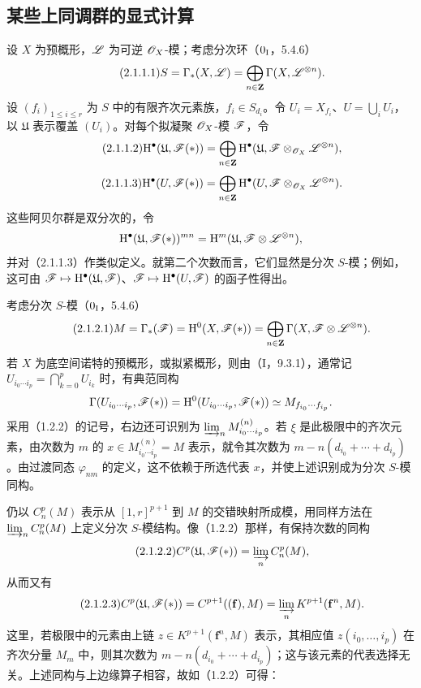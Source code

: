 \subsection{某些上同调群的显式计算}
设 $X$ 为预概形，$\mathscr L$ 为可逆 $\mathscr O_X$-模；考虑分次环（$0_{\mathrm I}$，5.4.6）
\begin{equation}\tag{2.1.1.1}
S=\Gamma_*(X,\mathscr L)=\bigoplus_{n\in\mathbf Z}\Gamma(X,\mathscr L^{\otimes n}).
\end{equation}
设 $(f_i)_{1\leq i\leq r}$ 为 $S$ 中的有限齐次元素族，$f_i\in S_{d_i}$。令 $U_i=X_{f_i}$、$U=\bigcup_iU_i$，以 $\mathfrak U$ 表示覆盖 $(U_i)$。对每个拟凝聚 $\mathscr O_X$-模 $\mathscr F$，令
\begin{equation}\tag{2.1.1.2}
\mathrm H^\bullet(\mathfrak U,\mathscr F(*))=\bigoplus_{n\in\mathbf Z}
\mathrm H^\bullet(\mathfrak U,\mathscr F\otimes_{\mathscr O_X}\mathscr L^{\otimes n}),
\end{equation}
\begin{equation}\tag{2.1.1.3}
\mathrm H^\bullet(U,\mathscr F(*))=\bigoplus_{n\in\mathbf Z}
\mathrm H^\bullet(U,\mathscr F\otimes_{\mathscr O_X}\mathscr L^{\otimes n}).
\end{equation}
这些阿贝尔群是双分次的，令
\[
\mathrm H^\bullet(\mathfrak U,\mathscr F(*))^{mn}=
\mathrm H^m(\mathfrak U,\mathscr F\otimes\mathscr L^{\otimes n}),
\]
并对（2.1.1.3）作类似定义。就第二个次数而言，它们显然是分次 $S$-模；例如，这可由 $\mathscr F\mapsto\mathrm H^\bullet(\mathfrak U,\mathscr F)$、$\mathscr F\mapsto\mathrm H^\bullet(U,\mathscr F)$ 的函子性得出。

考虑分次 $S$-模（$0_{\mathrm I}$，5.4.6）
\begin{equation}\tag{2.1.2.1}
M=\Gamma_*(\mathscr F)=\mathrm H^0(X,\mathscr F(*))=\bigoplus_{n\in\mathbf Z}\Gamma(X,\mathscr F\otimes\mathscr L^{\otimes n}).
\end{equation}
若 $X$ 为底空间诺特的预概形，或拟紧概形，则由（I，9.3.1），通常记 $U_{i_0\cdots i_p}=\bigcap_{k=0}^pU_{i_k}$ 时，有典范同构
\[
\Gamma(U_{i_0\cdots i_p},\mathscr F(*))=\mathrm H^0(U_{i_0\cdots i_p},\mathscr F(*))
\simeq M_{f_{i_0}\cdots f_{i_p}}.
\]
采用（1.2.2）的记号，右边还可识别为 $\varinjlim_nM^{(n)}_{i_0\cdots i_p}$。若 $\xi$ 是此极限中的齐次元素，由次数为 $m$ 的 $x\in M^{(n)}_{i_0\cdots i_p}=M$ 表示，就令其次数为
$m-n(d_{i_0}+\cdots+d_{i_p})$。由过渡同态 $\varphi_{nm}$ 的定义，这不依赖于所选代表 $x$，并使上述识别成为分次 $S$-模同构。

仍以 $C_n^p(M)$ 表示从 $[1,r]^{p+1}$ 到 $M$ 的交错映射所成模，用同样方法在 $\varinjlim_nC_n^p(M)$ 上定义分次 $S$-模结构。像（1.2.2）那样，有保持次数的同构
\begin{equation}\tag{2.1.2.2}
C^p(\mathfrak U,\mathscr F(*))=\varinjlim_nC_n^p(M),
\end{equation}
从而又有
\begin{equation}\tag{2.1.2.3}
C^p(\mathfrak U,\mathscr F(*))=C^{p+1}((\mathbf f),M)
=\varinjlim_nK^{p+1}(\mathbf f^n,M).
\end{equation}
这里，若极限中的元素由上链 $z\in K^{p+1}(\mathbf f^n,M)$ 表示，其相应值 $z(i_0,\ldots,i_p)$ 在齐次分量 $M_m$ 中，则其次数为 $m-n(d_{i_0}+\cdots+d_{i_p})$；这与该元素的代表选择无关。上述同构与上边缘算子相容，故如（1.2.2）可得：


